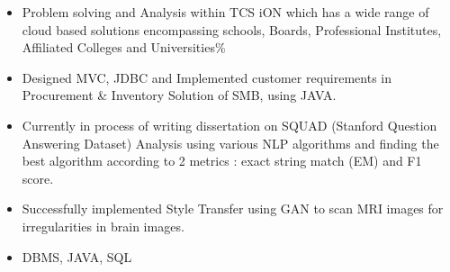 \documentclass[10pt,a4paper,ragged2e,withhyper]{altacv}
\begin{document}
\begin{paracol}{2}
\par\divider

\begin{itemize}
\item Problem solving and Analysis within TCS iON which has a wide range of cloud based solutions encompassing schools, Boards, 
Professional Institutes, Affiliated Colleges and Universities\%
\end{itemize}

\begin{itemize}
\item Designed MVC, JDBC and Implemented customer requirements in Procurement \& Inventory Solution of SMB, using JAVA.
\end{itemize}
\par\divider
\newpage

\switchcolumn
{}
\label{sec:org48b047d}



\label{sec:org3d9c66c}
\begin{itemize}
\item Currently in process of writing dissertation on SQUAD (Stanford Question Answering Dataset) Analysis using various NLP algorithms and finding the best algorithm according to 2 metrics : exact string match (EM) and F1 score.
\end{itemize}
\divider
{}
\begin{itemize}
\item Successfully implemented Style Transfer using GAN to scan MRI images for irregularities in brain images.
\end{itemize}
\divider
{}
\begin{itemize}
\item DBMS, JAVA, SQL
\end{itemize}


\end{paracol}
\end{document}
